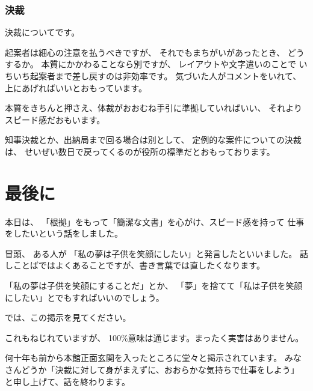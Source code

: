 \documentclass[uplatex,jis2004,dvipdfmx,12pt]{jsarticle}
\begin{document}
\subsubsection{決裁}

決裁についてです。

起案者は細心の注意を払うべきですが、
それでもまちがいがあったとき、
どうするか。
本質にかかわることなら別ですが、
レイアウトや文字遣いのことで
いちいち起案者まで差し戻すのは非効率です。
気づいた人がコメントをいれて、
上にあげればいいとおもっています。

本質をきちんと押さえ、体裁がおおむね手引に準拠していればいい、
それよりスピード感だおもいます。


知事決裁とか、出納局まで回る場合は別として、
定例的な案件についての決裁は、
せいぜい数日で戻ってくるのが役所の標準だとおもっております。



\section{最後に}
本日は、
「根拠」をもって「簡潔な文書」を心がけ、スピード感を持って
仕事をしたいという話をしました。

冒頭、
ある人が
「私の夢は子供を笑顔にしたい」と発言したといいました。
話しことばではよくあることですが、書き言葉では直したくなります。

「私の夢は子供を笑顔にすることだ」とか、
「夢」を捨てて「私は子供を笑顔にしたい」とでもすればいいのでしょう。

では、この掲示を見てください。

これもねじれていますが、
100\%意味は通じます。まったく実害はありません。


何十年も前から本館正面玄関を入ったところに堂々と掲示されています。
みなさんどうか「決裁に対して身がまえずに、おおらかな気持ちで仕事をしよう」
と申し上げて、話を終わります。
\end{document}
